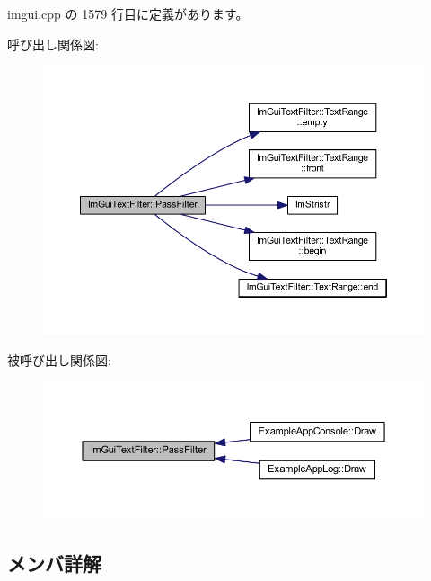  imgui.\+cpp の 1579 行目に定義があります。

呼び出し関係図\+:\nopagebreak
\begin{figure}[H]
\begin{center}
\leavevmode
\includegraphics[width=350pt]{struct_im_gui_text_filter_a88d73ff8b81fbbd0a129b1bf3498d8aa_cgraph}
\end{center}
\end{figure}
被呼び出し関係図\+:\nopagebreak
\begin{figure}[H]
\begin{center}
\leavevmode
\includegraphics[width=350pt]{struct_im_gui_text_filter_a88d73ff8b81fbbd0a129b1bf3498d8aa_icgraph}
\end{center}
\end{figure}


\subsection{メンバ詳解}
\mbox{\label{struct_im_gui_text_filter_ac31839c319fe4211c21fc143b7249f86}} 
